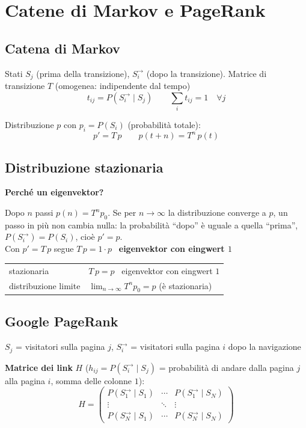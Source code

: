 \section{Catene di Markov e PageRank}

\subsection{Catena di Markov}

Stati $S_j$ (prima della transizione), $S_i^\to$ (dopo la transizione). Matrice di transizione $T$ (omogenea: indipendente dal tempo)
$$ \boxed{ t_{ij} = P(S_i^\to \mid S_j) } \qquad \sum_i t_{ij} = 1 \quad \forall j $$

Distribuzione $p$ con $p_i = P(S_i)$ (probabilità totale):
$$ \boxed{ p' = T \, p } \qquad \boxed{ p(t+n) = T^n \, p(t) } $$


\subsection{Distribuzione stazionaria}

\textbf{Perché un eigenvektor?} 

Dopo $n$ passi $p(n) = T^n p_0$. Se per $n \to \infty$ la distribuzione converge a $p$, un passo in più non cambia nulla: la probabilità ``dopo'' è uguale a quella ``prima'', $P(S_i^\to) = P(S_i)$, cioè $p' = p$. \\
Con $p' = T\,p$ segue $T\,p = 1 \cdot p$ \textrightarrow\ \textbf{eigenvektor con eingwert $1$}


\begin{tabular}{ll}
	stazionaria			& $T \, p = p$ \textrightarrow\ eigenvektor con eingwert $1$ \\
	distribuzione limite	& $\displaystyle \lim_{n \to \infty} T^n p_0 = p$ (è stazionaria)
\end{tabular}



\subsection{Google PageRank}

$S_j$ = visitatori sulla pagina $j$, $S_i^\to$ = visitatori sulla pagina $i$ dopo la navigazione

\textbf{Matrice dei link} $H$ \quad ($h_{ij} = P(S_i^\to \mid S_j)$ = probabilità di andare dalla pagina $j$ alla pagina $i$, somma delle colonne $1$):
$$ \boxed{ H = \begin{pmatrix}
	P(S_1^\to \mid S_1) & \cdots & P(S_1^\to \mid S_N) \\
	\vdots & \ddots & \vdots \\
	P(S_N^\to \mid S_1) & \cdots & P(S_N^\to \mid S_N)
\end{pmatrix} } $$

